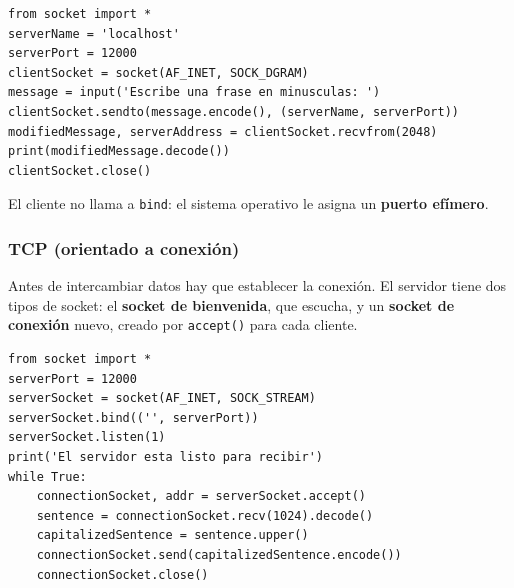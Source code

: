 \documentclass[11pt,a4paper]{article}
\begin{document}
\begin{lstlisting}[language=pyr,caption={UDPClient.py}]
from socket import *
serverName = 'localhost'
serverPort = 12000
clientSocket = socket(AF_INET, SOCK_DGRAM)
message = input('Escribe una frase en minusculas: ')
clientSocket.sendto(message.encode(), (serverName, serverPort))
modifiedMessage, serverAddress = clientSocket.recvfrom(2048)
print(modifiedMessage.decode())
clientSocket.close()
\end{lstlisting}

El cliente no llama a \texttt{bind}: el sistema operativo le asigna un \textbf{puerto efímero}.

\subsubsection{TCP (orientado a conexión)}

Antes de intercambiar datos hay que establecer la conexión. El servidor tiene dos tipos de socket: el \textbf{socket de bienvenida}, que escucha, y un \textbf{socket de conexión} nuevo, creado por \texttt{accept()} para cada cliente.

\begin{center}
\end{center}

\begin{lstlisting}[language=pyr,caption={TCPServer.py}]
from socket import *
serverPort = 12000
serverSocket = socket(AF_INET, SOCK_STREAM)
serverSocket.bind(('', serverPort))
serverSocket.listen(1)
print('El servidor esta listo para recibir')
while True:
    connectionSocket, addr = serverSocket.accept()
    sentence = connectionSocket.recv(1024).decode()
    capitalizedSentence = sentence.upper()
    connectionSocket.send(capitalizedSentence.encode())
    connectionSocket.close()
\end{lstlisting}
\end{document}
